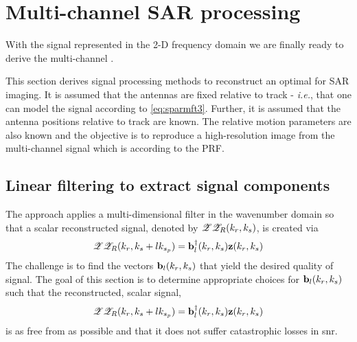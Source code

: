 \section{Multi-channel SAR processing}
\label{sc:hrws}
With the signal represented in the 2-D frequency domain we are finally ready to derive the \gls{multi-channel} .
\par
This section derives signal processing methods to reconstruct an optimal  for  SAR imaging. It is assumed that the antennas are fixed relative to track - {\em i.e.}, that one can model the signal according to \eqref{eq:sparmft3}. Further, it is assumed that the antenna positions relative to track are known. The relative motion parameters are also known and the objective is to reproduce a high-resolution image from the multi-channel signal which is  according to the PRF.
\subsection{Linear filtering to extract signal components}
\label{sc:linearfilt}
The  approach applies a multi-dimensional filter in the wavenumber domain so that a scalar reconstructed signal, denoted by $\mathscr{Z}\mathscr{Z}_{R}(k_r,k_{s})$, is created via 
\begin{equation}
 \mathscr{Z}\mathscr{Z}_{R}(k_r, k_{s} + lk_{s_p}) = \mathbf{b}^\dagger_l(k_r, k_{s})\mathbf{z}(k_r, k_{s})
\end{equation}
The challenge is to find the vectors $\mathbf{b}_l(k_r, k_{s})$ that yield the desired quality of signal. The goal of this section is to determine appropriate choices for $\mathbf{b}_l(k_r, k_{s})$ such that the reconstructed, scalar signal,
\begin{equation}
 \mathscr{Z}\mathscr{Z}_{R}(k_r, k_{s} + lk_{s_p}) = \mathbf{b}^\dagger_l(k_r, k_{s})\mathbf{z}(k_r, k_{s})
\end{equation}
is as free from  as possible and that it does not suffer catastrophic losses in \gls{snr}.
